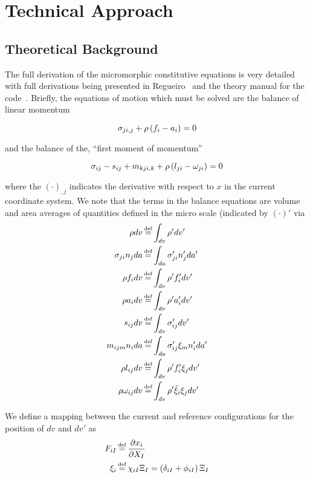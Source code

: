 \section{Technical Approach}

\subsection{Theoretical Background}

The full derivation of the micromorphic constitutive equations is very detailed with full derivations being presented in Regueiro~\cite{bib:regueiro_micro10} and the theory manual for the code~\cite{bib:miller17}. Briefly, the equations of motion which must be solved are the balance of linear momentum

\begin{equation}
\sigma_{ji,j} + \rho \left(f_i - a_i\right) = 0\\
\end{equation}

and the balance of the, ``first moment of momentum''

\begin{equation}
\sigma_{ij} - s_{ij} + m_{kji,k} + \rho \left(l_{ji} - \omega_{ji}\right) = 0\\
\end{equation}

where the $\left(\cdot\right)_{,j}$ indicates the derivative with respect to $x$ in the current coordinate system. We note that the terms in the balance equations are volume and area averages of quantities defined in the micro scale (indicated by $\left(\cdot\right)'$ via
\begin{align*}
\rho dv &\defeq \int_{dv} \rho' dv'\\
\sigma_{ji}n_j da &\defeq \int_{da} \sigma_{ji}'n_j'da'\\
\rho f_i dv &\defeq \int_{dv} \rho' f_i' dv'\\
\rho a_i dv &\defeq \int_{dv} \rho' a_i' dv'\\
s_{ij} dv &\defeq \int_{dv} \sigma_{ij}' dv'\\
m_{ijm} n_i da &\defeq \int_{da} \sigma_{ij}' \xi_m n_i' da'\\
\rho l_{ij} dv &\defeq \int_{dv} \rho' f_i' \xi_j dv'\\
\rho \omega_{ij} dv &\defeq \int_{dv} \rho' \ddot{\xi}_i \xi_j dv'\\
\end{align*}

We define a mapping between the current and reference configurations for the position of $dv$ and $dv'$ as
\begin{align*}
F_{iI} &\defeq \frac{\partial x_i}{\partial X_I}\\
\xi_i  &\defeq \chi_{iI}\Xi_I = \left(\delta_{iI}+\phi_{iI}\right)\Xi_I\\
\end{align*}

